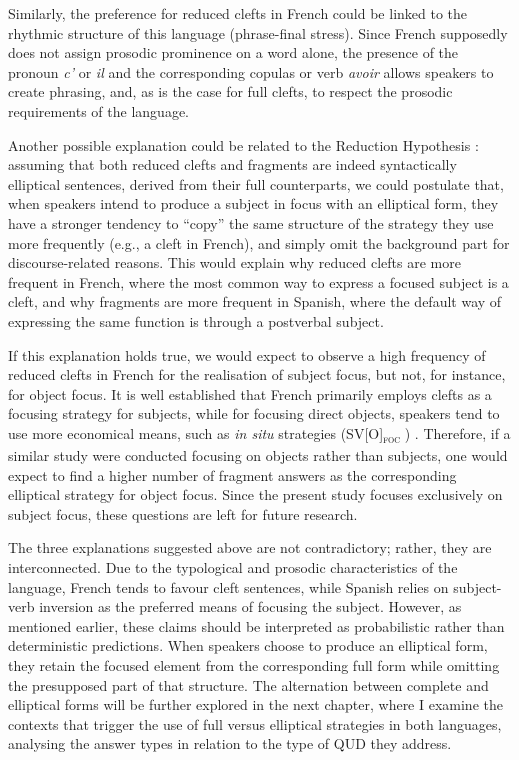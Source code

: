 Similarly, the preference for reduced clefts in French could be linked to the rhythmic structure of this language (phrase-final stress). Since French supposedly does not assign prosodic prominence on a word alone, the presence of the pronoun \textit{c'} or \textit{il} and the corresponding copulas or verb \textit{avoir} allows speakers to create phrasing, and, as is the case for full clefts, to respect the prosodic requirements of the language.

Another possible explanation could be related to the Reduction Hypothesis \parencite{jenkins2017cleft}: assuming that both reduced clefts and fragments are indeed syntactically elliptical sentences, derived from their full counterparts, we could postulate that, when speakers intend to produce a subject in focus with an elliptical form, they have a stronger tendency to ``copy” the same structure of the strategy they use more frequently (e.g., a cleft in French), and simply omit the background part for discourse-related reasons. This would explain why reduced clefts are more frequent in French, where the most common way to express a focused subject is a cleft, and why fragments are more frequent in Spanish, where the default way of expressing the same function is through a postverbal subject.

If this explanation holds true, we would expect to observe a high frequency of reduced clefts in French for the realisation of subject focus, but not, for instance, for object focus. It is well established that French primarily employs clefts as a focusing strategy for subjects, while for focusing direct objects, speakers tend to use more economical means, such as \textit{in situ} strategies (SV[O]\textsubscript{\textsc{foc}} \normalsize) \parencite{skopeteas2010focus, SkopeteasFanselow2011, destruel2016focus}. Therefore, if a similar study were conducted focusing on objects rather than subjects, one would expect to find a higher number of fragment answers as the corresponding elliptical strategy for object focus. Since the present study focuses exclusively on subject focus, these questions are left for future research.

The three explanations suggested above are not contradictory; rather, they are interconnected. Due to the typological and prosodic characteristics of the language, French tends to favour cleft sentences, while Spanish relies on subject-verb inversion as the preferred means of focusing the subject. However, as mentioned earlier, these claims should be interpreted as probabilistic rather than deterministic predictions. When speakers choose to produce an elliptical form, they retain the focused element from the corresponding full form while omitting the presupposed part of that structure.
The alternation between complete and elliptical forms will be further explored in the next chapter, where I examine the contexts that trigger the use of full versus elliptical strategies in both languages, analysing the answer types in relation to the type of QUD they address.
 

